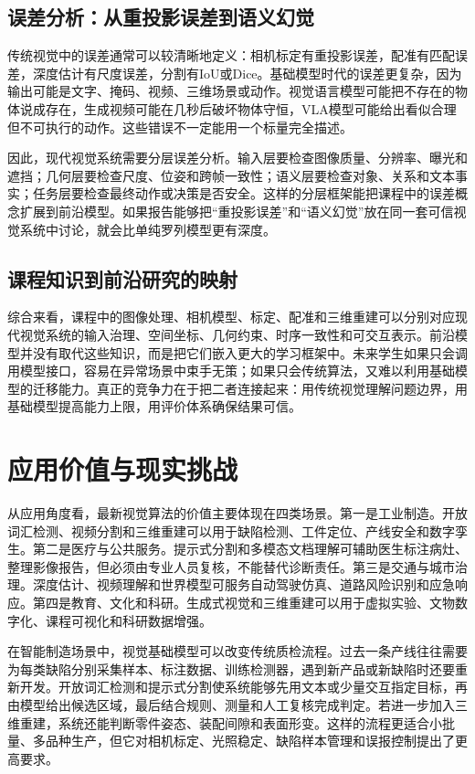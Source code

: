 \documentclass[UTF8,a4paper,12pt]{ctexart}
\begin{document}
\subsection{误差分析：从重投影误差到语义幻觉}
传统视觉中的误差通常可以较清晰地定义：相机标定有重投影误差，配准有匹配误差，深度估计有尺度误差，分割有IoU或Dice。基础模型时代的误差更复杂，因为输出可能是文字、掩码、视频、三维场景或动作。视觉语言模型可能把不存在的物体说成存在，生成视频可能在几秒后破坏物体守恒，VLA模型可能给出看似合理但不可执行的动作。这些错误不一定能用一个标量完全描述。

因此，现代视觉系统需要分层误差分析。输入层要检查图像质量、分辨率、曝光和遮挡；几何层要检查尺度、位姿和跨帧一致性；语义层要检查对象、关系和文本事实；任务层要检查最终动作或决策是否安全。这样的分层框架能把课程中的误差概念扩展到前沿模型。如果报告能够把“重投影误差”和“语义幻觉”放在同一套可信视觉系统中讨论，就会比单纯罗列模型更有深度。

\subsection{课程知识到前沿研究的映射}
综合来看，课程中的图像处理、相机模型、标定、配准和三维重建可以分别对应现代视觉系统的输入治理、空间坐标、几何约束、时序一致性和可交互表示。前沿模型并没有取代这些知识，而是把它们嵌入更大的学习框架中。未来学生如果只会调用模型接口，容易在异常场景中束手无策；如果只会传统算法，又难以利用基础模型的迁移能力。真正的竞争力在于把二者连接起来：用传统视觉理解问题边界，用基础模型提高能力上限，用评价体系确保结果可信。

\section{应用价值与现实挑战}
从应用角度看，最新视觉算法的价值主要体现在四类场景。第一是工业制造。开放词汇检测、视频分割和三维重建可以用于缺陷检测、工件定位、产线安全和数字孪生。第二是医疗与公共服务。提示式分割和多模态文档理解可辅助医生标注病灶、整理影像报告，但必须由专业人员复核，不能替代诊断责任。第三是交通与城市治理。深度估计、视频理解和世界模型可服务自动驾驶仿真、道路风险识别和应急响应。第四是教育、文化和科研。生成式视觉和三维重建可以用于虚拟实验、文物数字化、课程可视化和科研数据增强。

在智能制造场景中，视觉基础模型可以改变传统质检流程。过去一条产线往往需要为每类缺陷分别采集样本、标注数据、训练检测器，遇到新产品或新缺陷时还要重新开发。开放词汇检测和提示式分割使系统能够先用文本或少量交互指定目标，再由模型给出候选区域，最后结合规则、测量和人工复核完成判定。若进一步加入三维重建，系统还能判断零件姿态、装配间隙和表面形变。这样的流程更适合小批量、多品种生产，但它对相机标定、光照稳定、缺陷样本管理和误报控制提出了更高要求。
\end{document}
